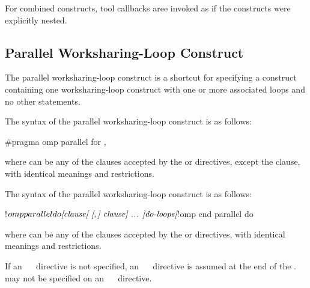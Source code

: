 For combined constructs, tool callbacks aree invoked as if the constructs were
explicitly nested.



\subsection{Parallel Worksharing-Loop Construct}
\label{subsec:Parallel Worksharing-Loop Construct}
\summary
The parallel worksharing-loop construct is a shortcut for specifying a 
 construct containing one worksharing-loop construct with 
one or more associated loops and no other statements.

\syntax
\begin{ccppspecific}
The syntax of the parallel worksharing-loop construct is as follows:

\begin{ompcPragma}
#pragma omp parallel for \plc{[clause[ [},\plc{] clause] ... ] new-line}
\end{ompcPragma}

where  can be any of the clauses accepted by the  
or  directives, except the  clause, with identical 
meanings and restrictions.
\end{ccppspecific}

\begin{fortranspecific}
The syntax of the parallel worksharing-loop construct is as follows:

\begin{ompfPragma}
!$omp parallel do \plc{[clause[ [},\plc{] clause] ... ]}
   \plc{do-loops}
\plc{[}!$omp end parallel do\plc{]}
\end{ompfPragma}

where  can be any of the clauses accepted by the  
or  directives, with identical meanings and restrictions.

If an ~~ directive is not specified, an 
~~ directive is assumed at the end of the 
.  may not be specified on an
~~ directive.
\end{fortranspecific}


